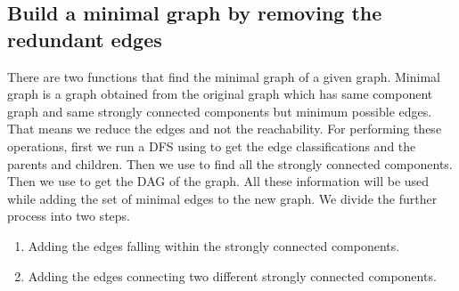\documentclass{article}
\begin{document}
\subsection{Build a minimal graph by removing the redundant edges}
There are two functions that find the minimal graph of a given graph. Minimal graph is a graph obtained from the original graph which has same component graph and same strongly connected components but minimum possible edges. That means we reduce the edges and not the reachability. For performing these operations, first we run a DFS using  to get the edge classifications and the parents and children. Then we use  to find all the strongly connected components. Then we use  to get the DAG of the graph. All these information will be used while adding the set of minimal edges to the new graph.\newline
We divide the further process into two steps.
\begin{enumerate}
	\item Adding the edges falling within the strongly connected components.
	\item Adding the edges connecting two different strongly connected components.
\end{enumerate}
\end{document}
